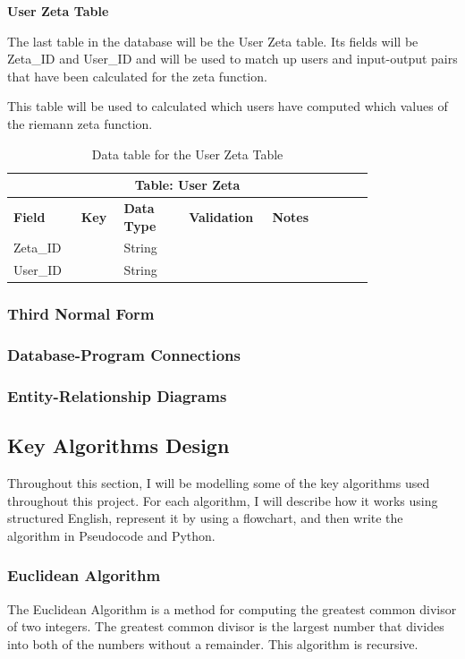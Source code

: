 \documentclass{article}
\begin{document}
\textbf{User Zeta Table}

The last table in the database will be the User Zeta table. Its fields will be Zeta\_ID and User\_ID and will be used to match up users and input-output pairs that have been calculated for the zeta function.

This table will be used to calculated which users have computed which values of the riemann zeta function.

\begin{table}[ht]
    \centering
    \begin{tabular}{ | p{0.15\linewidth} | p{0.1\linewidth} | p{0.16\linewidth} | p{0.14\linewidth} | p{0.25\linewidth} | }
    \hline
    \multicolumn{5}{|c|}{\textbf{Table: User Zeta}}\\
    \hline
    \hline
    \textbf{Field} & \textbf{Key} & \textbf{Data Type} & \textbf{Validation} & \textbf{Notes} \\
    \hline
    Zeta\_ID & & String & & \\
    \hline
    User\_ID & & String & & \\
    \hline
    \end{tabular}
    \caption{Data table for the User Zeta Table}
\end{table}

\subsubsection{Third Normal Form}
\subsubsection{Database-Program Connections}
\subsubsection{Entity-Relationship Diagrams}
\clearpage

\subsection{Key Algorithms Design}
Throughout this section, I will be modelling some of the key algorithms used throughout this project. For each algorithm, I will describe how it works using structured English, represent it by using a flowchart, and then write the algorithm in Pseudocode and Python.

\subsubsection{Euclidean Algorithm}
The Euclidean Algorithm is a method for computing the greatest common divisor of two integers. The greatest common divisor is the largest number that divides into both of the numbers without a remainder. This algorithm is recursive.
\end{document}
